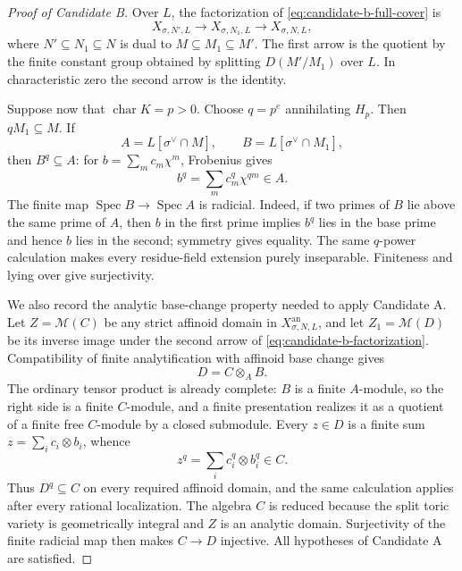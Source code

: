 \begin{proof}[Proof of Candidate B]
Over \(L\), the factorization of \eqref{eq:candidate-b-full-cover} is
\begin{equation}
 \label{eq:candidate-b-factorization}
 X_{\sigma,N',L}\longrightarrow X_{\sigma,N_1,L}
                         \longrightarrow X_{\sigma,N,L},
\end{equation}
where \(N'\subseteq N_1\subseteq N\) is dual to
\(M\subseteq M_1\subseteq M'\).  The first arrow is the quotient by the
finite constant group obtained by splitting \(D(M'/M_1)\) over \(L\).
In characteristic zero the second arrow is the identity.

Suppose now that \(\operatorname{char}K=p>0\).  Choose
\(q=p^e\) annihilating \(H_p\).  Then \(qM_1\subseteq M\).  If
\[
 A=L[\sigma^\vee\cap M],
 \qquad B=L[\sigma^\vee\cap M_1],
\]
then \(B^q\subseteq A\): for
\(b=\sum_m c_m\chi^m\), Frobenius gives
\[
                         b^q=\sum_m c_m^q\chi^{qm}\in A.
\]
The finite map \(\operatorname{Spec}B\to\operatorname{Spec}A\) is
radicial.  Indeed, if two primes of \(B\) lie above the same prime of
\(A\), then \(b\) in the first prime implies \(b^q\) lies in the base prime
and hence \(b\) lies in the second; symmetry gives equality.  The same
\(q\)-power calculation makes every residue-field extension purely
inseparable.  Finiteness and lying over give surjectivity.

We also record the analytic base-change property needed to apply Candidate
A.  Let \(Z=\mathcal M(C)\) be any strict affinoid domain in
\(X_{\sigma,N,L}^{\mathrm{an}}\), and let
\(Z_1=\mathcal M(D)\) be its inverse image under the second arrow of
\eqref{eq:candidate-b-factorization}.  Compatibility of finite
analytification with affinoid base change gives
\begin{equation}
 \label{eq:candidate-b-affinoid-base-change}
                              D=C\otimes_A B.
\end{equation}
The ordinary tensor product is already complete: \(B\) is a finite
\(A\)-module, so the right side is a finite \(C\)-module, and a finite
presentation realizes it as a quotient of a finite free \(C\)-module by a
closed submodule.  Every \(z\in D\) is a finite sum
\(z=\sum_i c_i\otimes b_i\), whence
\[
                     z^q=\sum_i c_i^q\otimes b_i^q\in C.
\]
Thus \(D^q\subseteq C\) on every required affinoid domain, and the same
calculation applies after every rational localization.  The algebra \(C\)
is reduced because the split toric variety is geometrically integral and
\(Z\) is an analytic domain.  Surjectivity of the finite radicial map then
makes \(C\to D\) injective.  All hypotheses of Candidate A are satisfied.


\end{proof}
